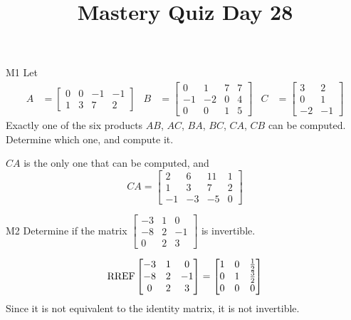 \documentclass{sbgLAquiz}
\title{Mastery Quiz Day 28 }
\begin{document}
\begin{problem}{M1}
Let 
\begin{align*}
A &= \begin{bmatrix} 0 & 0 & -1 & -1 \\ 1 & 3 & 7 & 2 \end{bmatrix} & B &= \begin{bmatrix} 0 & 1 & 7 & 7 \\ -1 & -2 & 0 & 4 \\ 0 & 0 & 1 & 5 \end{bmatrix} & C&=\begin{bmatrix} 3 & 2 \\ 0 & 1 \\ -2 & -1 \end{bmatrix}
\end{align*}
Exactly one of the six products $AB$, $AC$, $BA$, $BC$, $CA$, $CB$ can be computed.  Determine which one, and compute it.
\end{problem}
\begin{solution}
$CA$ is the only one that can be computed, and 
$$CA = \begin{bmatrix} 2 & 6 & 11 & 1 \\ 1 & 3 & 7 & 2 \\ -1 & -3 & -5 & 0 \end{bmatrix}$$
\end{solution}



\begin{problem}{M2}
Determine if the matrix $\begin{bmatrix}-3 & 1 & 0 \\ -8 & 2 & -1 \\ 0 & 2 & 3\end{bmatrix}$ is invertible.
\end{problem}
\begin{solution}
$$\operatorname{RREF} \begin{bmatrix}-3 & 1 & 0 \\ -8 & 2 & -1 \\ 0 & 2 & 3\end{bmatrix} = \begin{bmatrix} 1 & 0 & \frac{1}{2} \\ 0 & 1 & \frac{3}{2} \\ 0 & 0 & 0 \end{bmatrix}$$
Since it is not equivalent to the identity matrix, it is not invertible.
\end{solution}
\end{document}
